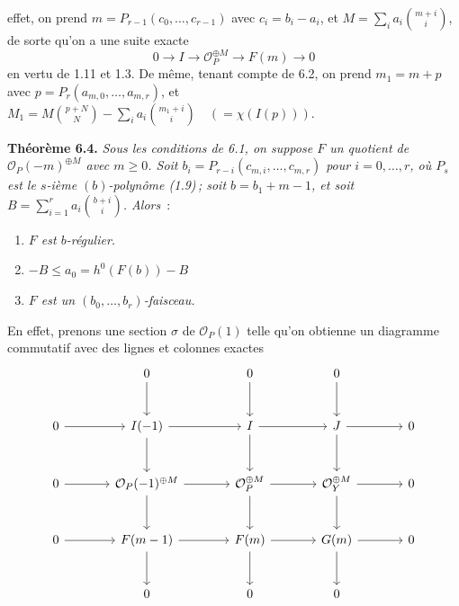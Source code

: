 effet, on prend $m=P_{r-1}(c_0,\ldots,c_{r-1})$ avec $c_i=b_i-a_i$, et $M=\sum_i a_i\binom{m+i}{i}$, de sorte qu'on a une suite exacte
\[
   0\longrightarrow I\longrightarrow \mathcal O_P^{\oplus M}
   \longrightarrow F(m)\longrightarrow0
\]
en vertu de 1.11 et 1.3. De m\^eme, tenant compte de 6.2, on prend $m_1=m+p$ avec $p=P_r(a_{m,0},\ldots,a_{m,r})$, et $M_1=M\binom{p+N}{N}-\sum_i a_i\binom{m_1+i}{i}\quad(=\chi(I(p)))$.

\textbf{Th\'eor\`eme 6.4.} \emph{Sous les conditions de 6.1, on suppose $F$ un quotient de $\mathcal O_P(-m)^{\oplus M}$ avec $m\ge0$. Soit $b_i=P_{r-i}(c_{m,i},\ldots,c_{m,r})$ pour $i=0,\ldots,r$, o\`u $P_s$ est le $s$-i\`eme $(b)$-polyn\^ome (1.9)\,; soit $b=b_1+m-1$, et soit $B=\sum_{i=1}^{r} a_i\binom{b+i}{i}$. Alors}~:
\begin{enumerate}[label=(\roman*)]
\item \emph{$F$ est $b$-r\'egulier.}
\item \emph{$-B\le a_0=h^0(F(b))-B$}
\item \emph{$F$ est un $(b_0,\ldots,b_r)$-faisceau.}
\end{enumerate}

En effet, prenons une section $\sigma$ de $\mathcal O_P(1)$ telle qu'on obtienne un diagramme commutatif avec des lignes et colonnes exactes
\[
\begin{tikzcd}[column sep=large,row sep=large]
&0 \arrow[d]&0 \arrow[d]&0 \arrow[d]&\\
0 \arrow[r]&I(-1) \arrow[r] \arrow[d]&I \arrow[r] \arrow[d]&J \arrow[r] \arrow[d]&0\\
0 \arrow[r]&\mathcal O_P(-1)^{\oplus M} \arrow[r] \arrow[d]&\mathcal O_P^{\oplus M} \arrow[r] \arrow[d]&\mathcal O_Y^{\oplus M} \arrow[r] \arrow[d]&0\\
0 \arrow[r]&F(m-1) \arrow[r] \arrow[d]&F(m) \arrow[r] \arrow[d]&G(m) \arrow[r] \arrow[d]&0\\
&0&0&0&
\end{tikzcd}
\]
